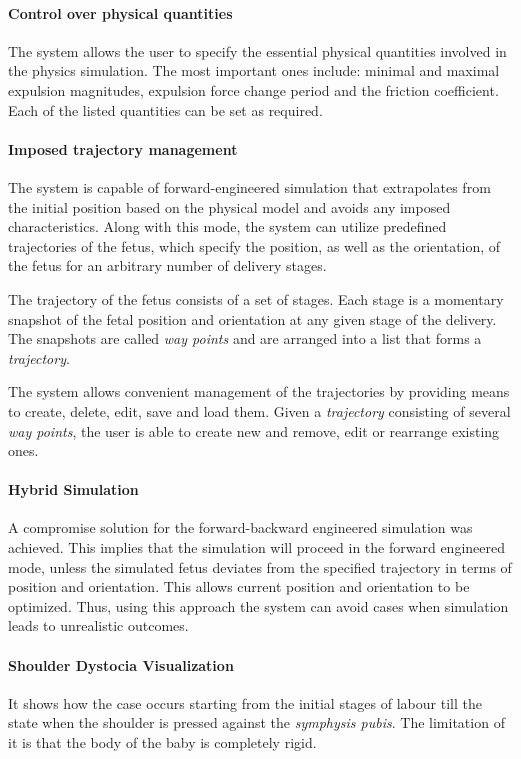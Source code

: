 \paragraph{Control over physical quantities}
The system allows the user to specify the essential physical quantities involved in the physics simulation. The most important ones include: minimal and maximal expulsion magnitudes, expulsion force change period and the friction coefficient. Each of the listed quantities can be set as required.

\paragraph{Imposed trajectory management}
The system is capable of forward-engineered simulation that extrapolates from the initial position based on the physical model and avoids any imposed characteristics. Along with this mode, the system can utilize predefined trajectories of the fetus, which specify the position, as well as the orientation, of the fetus for an arbitrary number of delivery stages.

The trajectory of the fetus consists of a set of stages. Each stage is a momentary snapshot of the fetal position and orientation at any given stage of the delivery. The snapshots are called \emph{way points} and are arranged into a list that forms a \emph{trajectory}.

The system allows convenient management of the trajectories by providing means to create, delete, edit, save and load them. Given a \emph{trajectory} consisting of several \emph{way points}, the user is able to create new and  remove, edit or rearrange existing ones.

\paragraph{Hybrid Simulation}
A compromise solution for the forward-backward engineered simulation was achieved. This implies that the simulation will proceed in the forward engineered mode, unless the simulated fetus deviates from the specified trajectory in terms of position and orientation. This allows current position and orientation to be optimized. Thus, using this approach the system can avoid cases when simulation leads to unrealistic outcomes.

\paragraph{Shoulder Dystocia Visualization}
It shows how the case occurs starting from the initial stages of labour till the state when the shoulder is pressed against the \emph{symphysis pubis}. The limitation of it is that the body of the baby is completely rigid.

